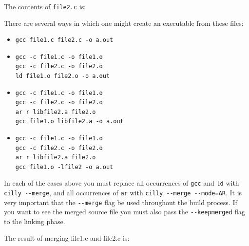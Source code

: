 \documentclass[letterpaper]{article}
\def\t#1{{\tt #1}}
\begin{document}
 The contents of \t{file2.c} is:


 There are several ways in which one might create an executable from these
files:
\begin{itemize}
\item
\begin{verbatim}
gcc file1.c file2.c -o a.out
\end{verbatim}

\item
\begin{verbatim}
gcc -c file1.c -o file1.o
gcc -c file2.c -o file2.o
ld file1.o file2.o -o a.out
\end{verbatim}

\item
\begin{verbatim}
gcc -c file1.c -o file1.o
gcc -c file2.c -o file2.o
ar r libfile2.a file2.o
gcc file1.o libfile2.a -o a.out
\end{verbatim}

\item
\begin{verbatim}
gcc -c file1.c -o file1.o
gcc -c file2.c -o file2.o
ar r libfile2.a file2.o
gcc file1.o -lfile2 -o a.out
\end{verbatim}
\end{itemize}

 In each of the cases above you must replace all occurrences of \t{gcc} and
\t{ld} with \t{cilly -{}-merge}, and all occurrences of \t{ar} with \t{cilly
-{}-merge -{}-mode=AR}. It is very important that the \t{-{}-merge} flag be used
throughout the build process. If you want to see the merged source file you
must also pass the \t{-{}-keepmerged} flag to the linking phase.

 The result of merging file1.c and file2.c is:
\end{document}
